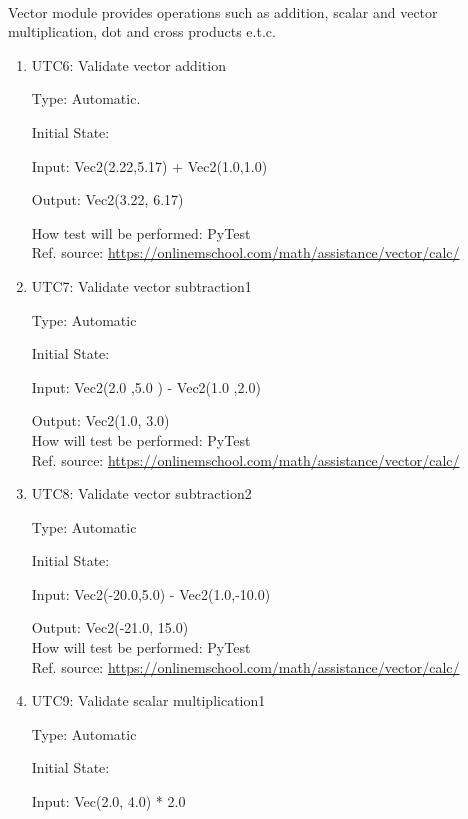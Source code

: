\documentclass[12pt, titlepage]{article}
\begin{document}
\paragraph{}
Vector module provides operations such as addition, scalar and vector multiplication, dot and cross products e.t.c.
\begin{enumerate}
	
	\item{UTC6}{: Validate vector addition \\}
	
	Type: Automatic.
	
	Initial State: 
	
	Input: Vec2(2.22,5.17) + Vec2(1.0,1.0)
	
	Output: Vec2(3.22, 6.17)
	
	How test will be performed: PyTest \\
	Ref. source: \url{https://onlinemschool.com/math/assistance/vector/calc/}
	
	\item{UTC7}{: Validate vector subtraction1\\}
	
	Type: Automatic
	
	Initial State: 
	
	Input: Vec2(2.0 ,5.0 ) - Vec2(1.0 ,2.0)
	
	Output: Vec2(1.0, 3.0)\\
	How will test be performed: PyTest\\
	Ref. source: \url{https://onlinemschool.com/math/assistance/vector/calc/}
	
	\item{UTC8}{: Validate vector subtraction2\\}
	
	Type: Automatic
	
	Initial State: 
	
	Input: Vec2(-20.0,5.0) - Vec2(1.0,-10.0)
	
	Output: Vec2(-21.0, 15.0)\\
	How will test be performed: PyTest\\
	Ref. source: \url{https://onlinemschool.com/math/assistance/vector/calc/}
	
	\item{UTC9}{: Validate scalar multiplication1\\}
	
	Type: Automatic
	
	Initial State: 
	
	Input: Vec(2.0, 4.0) * 2.0
	

\end{enumerate}
\end{document}

